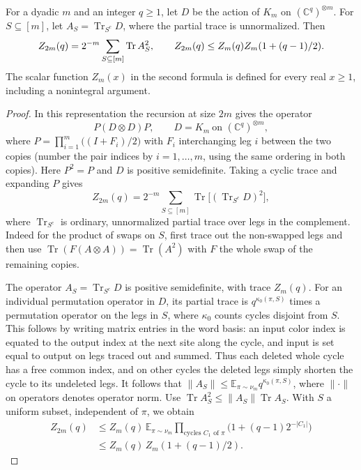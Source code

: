 \begin{lemma}\label{cas:swap-recursion}
For a dyadic $m$ and an integer $q\ge1$, let $D$ be the action of $K_m$
on $(\mathbb C^q)^{\otimes m}$.  For $S\subseteq[m]$, let
$A_S=\operatorname{Tr}_{S^c}D$, where the partial trace is unnormalized.
Then
\[
 Z_{2m}(q)=2^{-m}\sum_{S\subseteq[m]}\operatorname{Tr} A_S^2,
 \qquad
 Z_{2m}(q)\le Z_m(q)Z_m(1+(q-1)/2).
\]
The scalar function $Z_m(x)$ in the second formula is defined for every
real $x\ge1$, including a nonintegral argument.
\end{lemma}
\begin{proof}
In this representation the recursion at size \(2m\) gives the operator
\[
P(D\otimes D)P,\qquad D=K_m\ \text{on }(\mathbb C^q)^{\otimes m},
\]
where \(P=\prod_{i=1}^m \big((I+F_i)/2\big)\) with \(F_i\) interchanging leg \(i\) between the two copies (number the pair indices by \(i=1,\ldots,m\), using the same ordering in both copies). Here \(P^2=P\) and \(D\) is positive semidefinite. Taking a cyclic trace and expanding \(P\) gives
\begin{equation}
Z_{2m}(q)=2^{-m}\sum_{S\subseteq [m]}\operatorname{Tr}\big[(\operatorname{Tr}_{S^c} D)^2\big],
\label{cas:e2}
\end{equation}
where \(\operatorname{Tr}_{S^c}\) is ordinary, unnormalized partial trace over legs in the complement. Indeed for the product of swaps on \(S\), first trace out the non-swapped legs and then use \(\operatorname{Tr}(F(A\otimes A))=\operatorname{Tr}(A^2)\) with \(F\) the whole swap of the remaining copies.

The operator \(A_S=\operatorname{Tr}_{S^c}D\) is positive semidefinite, with trace \(Z_m(q)\). For an individual permutation operator in \(D\), its partial trace is \(q^{\kappa_0(\pi,S)}\) times a permutation operator on the legs in \(S\), where \(\kappa_0\) counts cycles disjoint from \(S\). This follows by writing matrix entries in the word basis: an input color index is equated to the output index at the next site along the cycle, and input is set equal to output on legs traced out and summed. Thus each deleted whole cycle has a free common index, and on other cycles the deleted legs simply shorten the cycle to its undeleted legs. It follows that \(\|A_S\|\le\mathbb E_{\pi\sim\nu_m} q^{\kappa_0(\pi,S)}\), where \(\|\cdot\|\) on operators denotes operator norm. Use \(\operatorname{Tr} A_S^2\le \|A_S\|\operatorname{Tr}A_S\). With \(S\) a uniform subset, independent of \(\pi\), we obtain
\begin{equation}
\begin{aligned}
Z_{2m}(q)
&\le Z_m(q)\,\mathbb E_{\pi\sim\nu_m}\prod_{\text{cycles }C_1\text{ of }\pi}
 \big(1+(q-1)2^{-|C_1|}\big)\\
&\le Z_m(q)\, Z_m(1+(q-1)/2).
\end{aligned}
\label{cas:e3}
\end{equation}
\end{proof}

